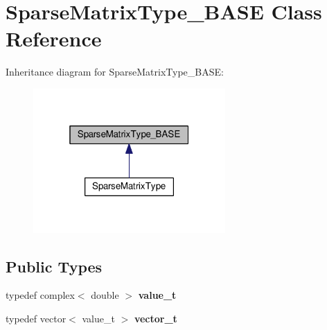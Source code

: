 \hypertarget{class_sparse_matrix_type___b_a_s_e}{}\section{Sparse\+Matrix\+Type\+\_\+\+B\+A\+SE Class Reference}
\label{class_sparse_matrix_type___b_a_s_e}


Inheritance diagram for Sparse\+Matrix\+Type\+\_\+\+B\+A\+SE\+:\nopagebreak
\begin{figure}[H]
\begin{center}
\leavevmode
\includegraphics[width=208pt]{class_sparse_matrix_type___b_a_s_e__inherit__graph}
\end{center}
\end{figure}
\subsection*{Public Types}
\begin{DoxyCompactItemize}
\item 
typedef complex$<$ double $>$ {\bfseries value\+\_\+t}\hypertarget{class_sparse_matrix_type___b_a_s_e_a9291ab7ea4ac6d98db8f4debe8e32e1d}{}\label{class_sparse_matrix_type___b_a_s_e_a9291ab7ea4ac6d98db8f4debe8e32e1d}

\item 
typedef vector$<$ value\+\_\+t $>$ {\bfseries vector\+\_\+t}\hypertarget{class_sparse_matrix_type___b_a_s_e_a57c552a5411526c9a46b045c1a47804b}{}\label{class_sparse_matrix_type___b_a_s_e_a57c552a5411526c9a46b045c1a47804b}

\end{DoxyCompactItemize}
